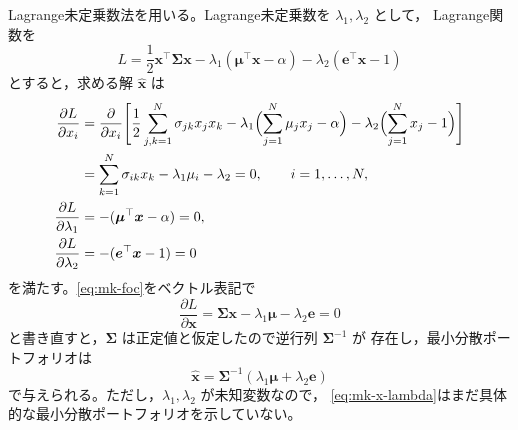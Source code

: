 Lagrange未定乗数法を用いる。Lagrange未定乗数を $\lambda_1, \lambda_2$ として，
Lagrange関数を
\begin{equation}
L = \frac{1}{2}\bm{x}^\top\bm{\Sigma}\bm{x}
- \lambda_1(\bm{\mu}^\top\bm{x} - \alpha)
- \lambda_2(\bm{e}^\top\bm{x} - 1)
\end{equation}
とすると，求める解 $\hat{\bm{x}}$ は
\begin{align}
\frac{\partial L}{\partial x_i}
&= \frac{\partial}{\partial x_i}\Biggl[\frac{1}{2}\sum_{j,k=1}^{N}
\sigma_{jk}x_j x_k - \lambda_1\Bigl(\sum_{j=1}^N \mu_j x_j - \alpha\Bigr)
- \lambda_2\Bigl(\sum_{j=1}^N x_j - 1\Bigr)\Biggr]\notag\\
&= \sum_{k=1}^{N}\sigma_{ik}x_k - \lambda_1\mu_i - \lambda_2 = 0,
\qquad i=1,\dots,N,
\label{eq:mk-foc}\\
\frac{\partial L}{\partial\lambda_1}
&= -(\bm{\mu}^\top\bm{x} - \alpha) = 0,\\
\frac{\partial L}{\partial\lambda_2}
&= -(\bm{e}^\top\bm{x} - 1) = 0
\end{align}
を満たす。\eqref{eq:mk-foc}をベクトル表記で
\begin{equation}
\frac{\partial L}{\partial\bm{x}}
= \bm{\Sigma}\bm{x} - \lambda_1\bm{\mu} - \lambda_2\bm{e} = 0
\end{equation}
と書き直すと，$\bm{\Sigma}$ は正定値と仮定したので逆行列 $\bm{\Sigma}^{-1}$ が
存在し，最小分散ポートフォリオは
\begin{equation}
\hat{\bm{x}} = \bm{\Sigma}^{-1}(\lambda_1\bm{\mu} + \lambda_2\bm{e})
\label{eq:mk-x-lambda}
\end{equation}
で与えられる。ただし，$\lambda_1,\lambda_2$ が未知変数なので，
\eqref{eq:mk-x-lambda}はまだ具体的な最小分散ポートフォリオを示していない。

